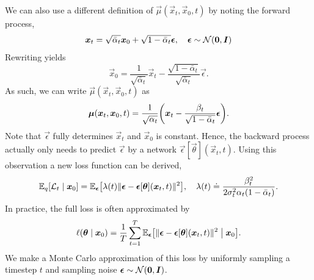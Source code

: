We can also use a different definition of $\vec{\mu}(\vec{x}_t, \vec{x}_0, t)$ by noting the forward process, \[
    \bm{x}_t = \sqrt{\bar{\alpha}_t} \bm{x}_0 + \sqrt{1-\bar{\alpha}_t} \bm{\epsilon}, \quad \bm{\epsilon} \sim \mathcal{N}(\bm{0}, \bm{I}) \\
\]
Rewriting yields \[
    \vec{x}_0 = \frac{1}{\sqrt{\bar{\alpha}_t}} \vec{x}_t - \frac{\sqrt{1-\bar{\alpha}_t}}{\sqrt{\bar{\alpha}_t}} \vec{\epsilon}.
\]
As such, we can write $\vec{\mu}(\vec{x}_t, \vec{x}_0, t)$ as \[
    \vec{\mu}(\vec{x}_t, \vec{x}_0, t) = \frac{1}{\sqrt{\alpha_t}} \lft( \vec{x}_t - \frac{\beta_t}{\sqrt{1-\bar{\alpha}_t}} \vec{\epsilon} \rgt).
\]
Note that $\vec{\epsilon}$ fully determines $\vec{x}_t$ and $\vec{x}_0$ is constant. Hence, the backward process actually only needs to predict $\vec{\epsilon}$ by a network $\vec{\epsilon}[\vec{\theta}](\vec{x}_t, t)$. Using this observation a new loss function can be derived, \[
    \E_q [\mathcal{L}_t \mid \vec{x}_0] = \E_{\vec{\epsilon}} \lft[\lambda(t) \| \vec{\epsilon} - \vec{\epsilon}[\vec{\theta}](\vec{x}_t, t) \|^2 \rgt], \quad \lambda(t) \doteq \frac{\beta_t^2}{2 \sigma_t^2 \alpha_t (1-\bar{\alpha}_t)}.
\]
In practice, the full loss is often approximated by \[
    \ell(\vec{\theta} \mid \vec{x}_0) = \frac{1}{T} \sum_{t=1}^{T} \E_{\vec{\epsilon}} \lft[ \| \vec{\epsilon} - \vec{\epsilon}[\vec{\theta}](\vec{x}_t, t) \|^2 \;\middle|\; \vec{x}_0 \rgt].
\]
We make a Monte Carlo approximation of this loss by uniformly sampling a timestep $t$ and sampling noise $\bm{\epsilon} \sim \mathcal{N}(\bm{0}, \bm{I})$.
